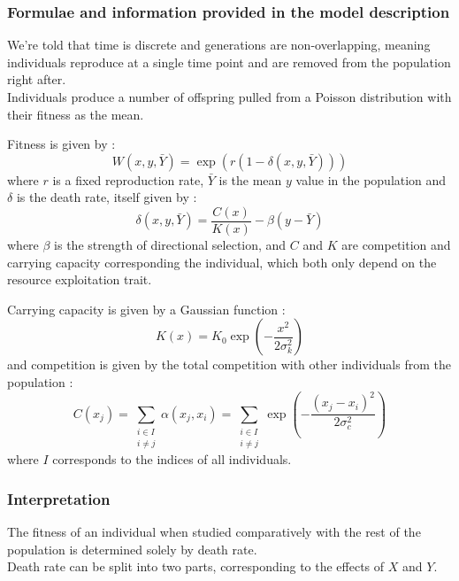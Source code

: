 \documentclass{article}
\begin{document}
\subsubsection{Formulae and information provided in the model description}

We're told that time is discrete and generations are non-overlapping, meaning individuals reproduce at a single time point and are removed from the population right after. \\
\vspace{5mm}
Individuals produce a number of offspring pulled from a Poisson distribution with their fitness as the mean. \\
\vspace{1cm}

Fitness is given by : \\
$$W(x,y,\bar{Y}) = \exp(r(1-\delta(x,y,\bar{Y})))$$
where $r$ is a fixed reproduction rate, $\bar{Y}$ is the mean $y$ value in the population and $\delta$ is the death rate, itself given by : \\
$$\delta(x,y,\bar{Y}) = \frac{C(x)}{K(x)} - \beta(y-\bar{Y})$$
where $\beta$ is the strength of directional selection, and $C$ and $K$ are competition and carrying capacity corresponding the individual, which both only depend on the resource exploitation trait. \\
\vspace{5mm}

Carrying capacity is given by a Gaussian function : \\
$$K(x) = K_0 \exp \left( -\frac{x^2}{2\sigma_k^2} \right)$$
and competition is given by the total competition with other individuals from the population : \\
$$C(x_j) = \sum_{\substack{i \in I \\ i \neq j}}{\alpha(x_j,x_i)} = \sum_{\substack{i \in I \\ i \neq j}}{\exp \left( - \frac{(x_j-x_i)^2}{2\sigma_c^2} \right)}$$
where $I$ corresponds to the indices of all individuals. \\
\vspace{5mm}

\subsubsection{Interpretation}

The fitness of an individual when studied comparatively with the rest of the population is determined solely by death rate. \\
Death rate can be split into two parts, corresponding to the effects of $X$ and $Y$. \\
\vspace{5mm}
\end{document}
